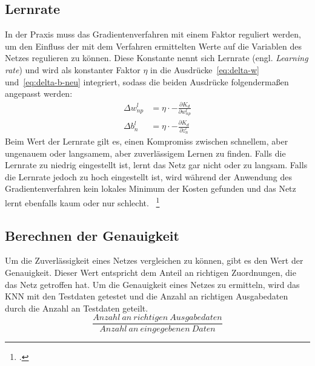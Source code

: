 \subsection{Lernrate}\label{subsec:lernrate}
In der Praxis muss das Gradientenverfahren mit einem Faktor reguliert werden, um den Einfluss der mit dem Verfahren ermittelten Werte auf die Variablen des Netzes regulieren zu können.
Diese Konstante nennt sich Lernrate (engl. \textit{Learning rate}) und wird als konstanter Faktor $\eta$ in die Ausdrücke~\eqref{eq:delta-w} und~\eqref{eq:delta-b-neu} integriert, sodass die beiden Ausdrücke folgendermaßen angepasst werden:
\begin{align}
    \Delta w^l_{n p} &= \eta \cdot -\frac{\partial K_d}{\partial w^l_{n p}}
    \label{eq:delta-w-mit-lr}\\
    \Delta b^l_n &= \eta \cdot -\frac{\partial K_d}{\partial z^l_n}
    \label{eq:delta-b-mit-lr}
\end{align}
Beim Wert der Lernrate gilt es, einen Kompromiss zwischen schnellem, aber ungenauem oder langsamem, aber zuverlässigem Lernen zu finden.
Falls die Lernrate zu niedrig eingestellt ist, lernt das Netz gar nicht oder zu langsam.
Falls die Lernrate jedoch zu hoch eingestellt ist, wird während der Anwendung des Gradientenverfahren kein lokales Minimum der Kosten gefunden und das Netz lernt ebenfalls kaum oder nur schlecht.
~\footcite{3b1b-4}

\subsection{Berechnen der Genauigkeit}\label{subsec:genauigkeit}
Um die Zuverlässigkeit eines Netzes vergleichen zu können, gibt es den Wert der Genauigkeit.
Dieser Wert entspricht dem Anteil an richtigen Zuordnungen, die das Netz getroffen hat.
Um die Genauigkeit eines Netzes zu ermitteln, wird das KNN mit den Testdaten getestet und die Anzahl an richtigen Ausgabedaten durch die Anzahl an Testdaten geteilt.
\begin{equation*}
    \frac{Anzahl~an~richtigen~Ausgabedaten}{Anzahl~an~eingegebenen~Daten}
    \label{eq:genauigkeit}
\end{equation*}

